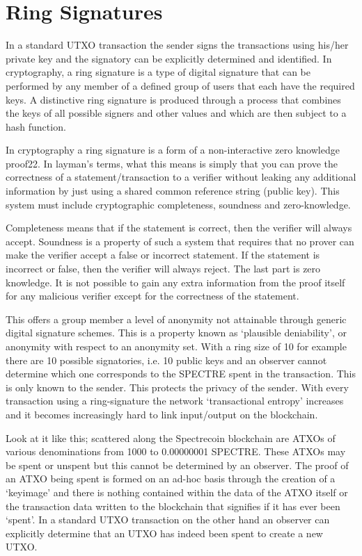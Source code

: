 \chapter{Ring Signatures}
In a standard UTXO transaction the sender signs the transactions using his/her
private key and the signatory can be explicitly determined and identified. In
cryptography, a ring signature is a type of digital signature that can be
performed by any member of a defined group of users that each have the required
keys. A distinctive ring signature is produced through a process that combines
the keys of all possible signers and other values and which are then subject to
a hash function.



In cryptography a ring signature is a form of a non-interactive zero knowledge
proof22. In layman’s terms, what this means is simply that you can prove the
correctness of a statement/transaction to a verifier without leaking any additional
information by just using a shared common reference string (public key).
This system must include cryptographic completeness, soundness and zero-knowledge.



Completeness means that if the statement is correct, then the verifier will
always accept. Soundness is a property of such a system that requires that
no prover can make the verifier accept a false or incorrect statement. If the
statement is incorrect or false, then the verifier will always reject. The
last part is zero knowledge. It is not possible to gain any extra information
from the proof itself for any malicious verifier except for the correctness of
the statement.



This offers a group member a level of anonymity not attainable through generic
digital signature schemes. This is a property known as ‘plausible deniability’,
or anonymity with respect to an anonymity set. With a ring size of 10 for example
there are 10 possible signatories, i.e. 10 public keys and an observer cannot
determine which one corresponds to the SPECTRE spent in the transaction. This
is only known to the sender. This protects the privacy of the sender. With every
transaction using a ring-signature the network ‘transactional entropy’ increases
and it becomes increasingly hard to link input/output on the blockchain.



Look at it like this; scattered along the Spectrecoin blockchain are ATXOs of
various denominations from 1000 to 0.00000001 SPECTRE. These ATXOs may be spent
or unspent but this cannot be determined by an observer. The proof of an ATXO
being spent is formed on an ad-hoc basis through the creation of a ‘keyimage’
and there is nothing contained within the data of the ATXO itself or the
transaction data written to the blockchain that signifies if it has ever been
‘spent’. In a standard UTXO transaction on the other hand an observer can
explicitly determine that an UTXO has indeed been spent to create a new UTXO.



